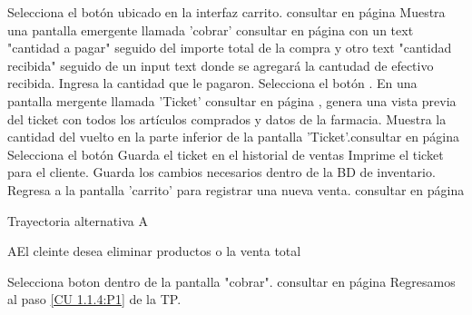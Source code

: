 
\begin{UCtrayectoria}
		
	\UCpaso [\UCactor]Selecciona el botón  ubicado en la interfaz carrito. consultar en página \pageref{UI: carrito}
	\UCpaso [\UCsist]Muestra una pantalla emergente llamada 'cobrar' consultar en página \pageref{UI: carrito Cobrar} con un text "cantidad a pagar" seguido del importe total de la compra y otro text "cantidad recibida" seguido de un input text donde se agregará la cantudad de efectivo recibida.
	\UCpaso [\UCactor]Ingresa la cantidad que le pagaron.
	\UCpaso [\UCactor]Selecciona el botón . 
	\UCpaso [\UCsist] En una pantalla mergente llamada 'Ticket' consultar en página \pageref{UI: carrito ticket}, genera una vista previa del ticket con todos los artículos comprados y datos de la farmacia.
	\UCpaso [\UCsist]Muestra la cantidad del vuelto en la parte inferior de la pantalla 'Ticket'.consultar en página \pageref{UI: carrito ticket}
	\UCpaso [\UCactor] Selecciona el botón 
	\UCpaso [\UCsist]Guarda el ticket en el historial de ventas 
	\UCpaso [\UCsist]Imprime el ticket para el cliente.
	\UCpaso [\UCsist]Guarda los cambios necesarios dentro de la BD de inventario.
	\UCpaso [\UCsist]Regresa a la pantalla 'carrito' para registrar una nueva venta. consultar en página \pageref{UI: carrito}
\end{UCtrayectoria}


Trayectoria alternativa A

\begin{UCtrayectoriaA}{A}{El cleinte desea eliminar productos o la venta total}

	\UCpaso [\UCactor] Selecciona boton  dentro de la pantalla "cobrar".  consultar en página \pageref{UI: carrito Cobrar} 	
	\UCpaso [\UCsist]Regresamos al paso \ref{CU 1.1.4:P1} de la TP.
\end{UCtrayectoriaA}


